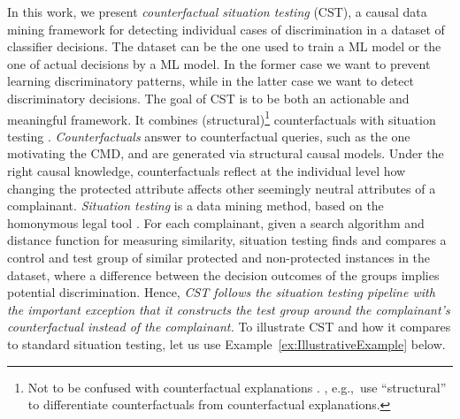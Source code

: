 In this work, we present \textit{counterfactual situation testing} (CST), a causal data mining framework for detecting individual cases of discrimination in a dataset of classifier decisions.
The dataset can be the one used to train a ML model or the one of actual decisions by a ML model. 
In the former case we want to prevent learning discriminatory patterns, while in the latter case we want to detect discriminatory decisions.
%
The goal of CST is to be both an actionable and meaningful framework.
It combines (structural)\footnote{Not to be confused with counterfactual explanations \parencite{Wachter2017Counterfactual}. \textcite{Karimi2021_AlgoRecourse}, e.g.,~use ``structural'' to differentiate counterfactuals from counterfactual explanations.} 
counterfactuals \parencite{PearlCausality2009} with situation testing \parencite{Thanh_KnnSituationTesting2011}.
%
\textit{Counterfactuals} answer to counterfactual queries, such as the one motivating the CMD, and are generated via structural causal models. 
Under the right causal knowledge, counterfactuals reflect at the individual level how changing the protected attribute affects other seemingly neutral attributes of a complainant.
%
\textit{Situation testing} is a data mining method, based on the homonymous legal tool \parencite{Bendick2007SituationTesting, Rorive2009_ProvingDiscrimination}. 
For each complainant, given a search algorithm and distance function for measuring similarity, situation testing finds and compares a control and test group of similar protected and non-protected instances in the dataset, where a difference between the decision outcomes of the groups implies potential discrimination.
Hence, \textit{CST follows the situation testing pipeline with the important exception that it constructs the test group around the complainant's counterfactual instead of the complainant.}
To illustrate CST and how it compares to standard situation testing, let us use Example~\ref{ex:IllustrativeExample} below.

